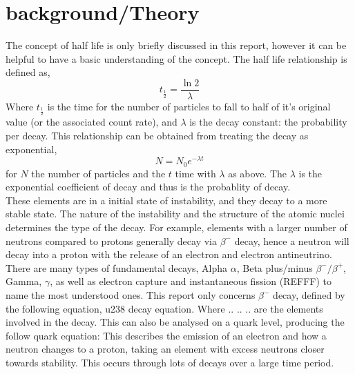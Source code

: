\documentclass[11pt]{article}
\begin{document}
    
    \section{background/Theory}
    The concept of half life is only briefly discussed in this report, however it can be helpful to have a basic understanding of the concept. The half life relationship is defined as,
    \begin{equation}
        t_{\frac{1}{2}} = \frac{\ln{2}}{\lambda}
    \end{equation}
    Where $ t_{\frac{1}{2}}$ is the time for the number of particles to fall to half of it's original value (or the associated count rate), and $\lambda$ is the decay constant: the probability per decay. This relationship can be obtained from treating the decay as exponential, 
    $$N = N_0 e^{-\lambda t}$$
    for $N$ the number of particles and the $t$ time with $\lambda$ as above.  The $\lambda$ is the exponential coefficient of decay and thus is the probablity of decay. 
   \\
   These elements are in a initial state of instability, and they decay to a more stable state. The nature of the instability and the structure of the atomic nuclei determines the type of the decay. For example, elements with a larger number of neutrons compared to protons generally decay via $\beta^{-}$ decay, hence a neutron will decay into a proton with the release of an electron and electron antineutrino. 
   There are many types of fundamental decays, Alpha $\alpha$, Beta plus/minus $\beta^{-}/\beta^{+}$, Gamma, $\gamma$, as well as electron capture and instantaneous fission (REFFF) to name the most understood ones. This report only concerns $\beta^{-}$ decay, defined by the following equation,
   u238 decay equation.
   Where .. .. .. are the elements involved in the decay. This can also be analysed on a quark level, producing the follow quark equation:
 \newline
This describes the emission of an electron and how a neutron changes to a proton, taking an element with excess neutrons closer towards stability. This occurs through lots of decays over a large time period. 
   \\
   \\
\end{document}
